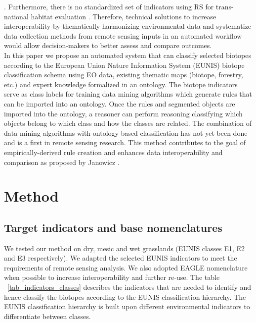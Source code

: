 \documentclass[authoryear, review,12pt,number]{elsarticle}
\begin{document}
\citep{Janowicz2012}. 
Furthermore, there is no standardized set of indicators
using RS for trans-national habitat evaluation \citep{Lucas2015}. Therefore,
technical solutions to increase interoperability by thematically harmonizing
environmental data and systematize data collection methods from remote sensing
inputs in an automated workflow would allow decision-makers to better assess and
compare outcomes.
\\
In this paper we propose an automated system that can
classify selected biotopes according to the European Union Nature Information
System (EUNIS) biotope classification schema using EO data, existing
thematic maps (biotope, forestry, etc.) and expert knowledge formalized in an
ontology. The biotope indicators serve as class labels for training data mining
algorithms which generate rules that can be imported into an ontology. Once the
rules and segmented objects are imported into the ontology, a reasoner can
perform reasoning classifying which objects belong to which class and how the
classes are related. The combination of data mining algorithms with
ontology-based classification has not yet been done and is a first in remote
sensing research. This method contributes to the goal of empirically-derived
rule creation and enhances data interoperability and comparison as proposed by
Janowicz \citep{Janowicz2012}.
\section{Method}
\subsection{Target indicators and base nomenclatures}
We tested our method on dry, mesic and wet grasslands (EUNIS classes E1, E2 and
E3 respectively). We adapted the selected EUNIS indicators to meet the
requirements of remote sensing analysis. We also adopted EAGLE nomenclature when
possible to increase interoperability and further re-use. The table
~\ref{tab_indicators_classes} describes the indicators that are needed to
identify and hence classify the biotopes according to the EUNIS classification
hierarchy. The EUNIS classification hierarchy is built upon different
environmental indicators to differentiate between classes. 
\end{document}

